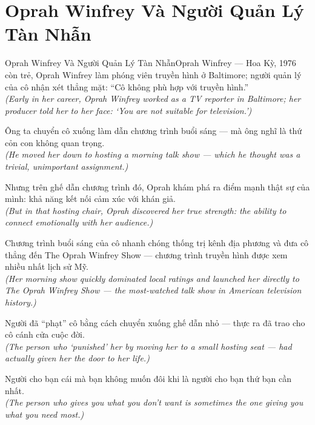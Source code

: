\section{Oprah Winfrey Và Người Quản Lý Tàn Nhẫn}
\begin{truyen}{Oprah Winfrey Và Người Quản Lý Tàn Nhẫn}{Oprah Winfrey --- Hoa Kỳ, 1976}
 còn trẻ, Oprah Winfrey làm phóng viên truyền hình ở Baltimore; người quản lý của cô nhận xét thẳng mặt: ``Cô không phù hợp với truyền hình.''\\[4pt]
\textit{(Early in her career, Oprah Winfrey worked as a TV reporter in Baltimore; her producer told her to her face: `You are not suitable for television.')}

Ông ta chuyển cô xuống làm dẫn chương trình buổi sáng --- mà ông nghĩ là thứ cỏn con không quan trọng.\\[4pt]
\textit{(He moved her down to hosting a morning talk show --- which he thought was a trivial, unimportant assignment.)}

Nhưng trên ghế dẫn chương trình đó, Oprah khám phá ra điểm mạnh thật sự của mình: khả năng kết nối cảm xúc với khán giả.\\[4pt]
\textit{(But in that hosting chair, Oprah discovered her true strength: the ability to connect emotionally with her audience.)}

Chương trình buổi sáng của cô nhanh chóng thống trị kênh địa phương và đưa cô thẳng đến The Oprah Winfrey Show --- chương trình truyền hình được xem nhiều nhất lịch sử Mỹ.\\[4pt]
\textit{(Her morning show quickly dominated local ratings and launched her directly to The Oprah Winfrey Show --- the most-watched talk show in American television history.)}

Người đã ``phạt'' cô bằng cách chuyển xuống ghế dẫn nhỏ --- thực ra đã trao cho cô cánh cửa cuộc đời.\\[4pt]
\textit{(The person who `punished' her by moving her to a small hosting seat --- had actually given her the door to her life.)}

\end{truyen}
\begin{baihoc}
  Người cho bạn cái mà bạn không muốn đôi khi là người cho bạn thứ bạn cần nhất.\\[4pt]
  \textit{(The person who gives you what you don't want is sometimes the one giving you what you need most.)}
\end{baihoc}

